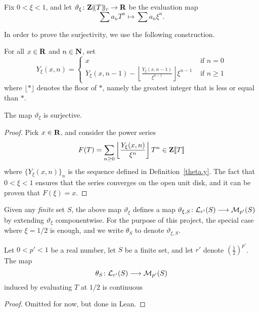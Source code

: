 \begin{definition}
  \label{theta}
  \leanok
  Fix $0<\xi <1$, and let $\vartheta_{\xi}\colon \mathbf{Z}(\!(T)\!)_r\rightarrow \mathbf{R}$ be the evaluation map
  \[
    \sum a_nT^n\longmapsto \sum a_n\xi^n.
  \]
\end{definition}

In order to prove the surjectivity, we use the following construction.
\begin{definition}
  \label{theta.y}
  \leanok
  For all $x \in \mathbf{R}$ and $n\in\mathbf{N}$, set
  \[
    Y_\xi(x, n)=
    \begin{cases}
      x&\text{ if } n = 0 \\
      Y_\xi(x,n-1) - \left\lfloor \frac{Y_\xi(x,n-1)}{\xi^{n-1}} \right\rfloor \xi^{n-1} & \text{ if } n \ge 1
    \end{cases}
  \]
where $\lfloor \ast \rfloor$ denotes the floor of $\ast$, namely the greatest integer that is less or equal than $\ast$.
\end{definition}

\begin{lemma}
  \label{theta.surjective}
  \leanok
  The map $\vartheta_{\xi}$ is surjective.
\end{lemma}

\begin{proof}
  \leanok
  Pick $x\in \mathbf{R}$, and consider the power series
  \[
    F(T)=\sum_{n\geq 0}\left\lfloor \frac{Y_\xi(x,n)}{\xi^n}\right\rfloor T^n\in\mathbf{Z}[\![T]\!]
  \]
  where $\{Y_\xi(x,n)\}_{n}$ is the sequence defined in Definition~\ref{theta.y}. The fact that $0<\xi<1$ ensures that the series converges on the open unit disk, and it can be proven that $F(\xi)=x$.
\end{proof}

Given any \emph{finite} set $S$, the above map $\vartheta_{\xi}$ defines a map $\vartheta_{\xi,S}\colon \mathcal L_{r'}(S)\longrightarrow \mathcal M_{p'}(S)$ by extending $\vartheta_{\xi}$ componentwise.
For the purpose of this project, the special case where $\xi=1/2$ is enough, and we write $\theta_S$ to denote $\vartheta_{\xi,S}$. 

\begin{lemma}
  \label{theta.continuous}
  \leanok
Let $0<p'<1$ be a real number, let $S$ be a finite set, and let $r'$ denote $\left(\frac{1}{2}\right)^{p'}$. The map
\[
\theta_{S}\colon \mathcal L_{r'}(S)\longrightarrow \mathcal M_{p'}(S)
\]
induced by evaluating $T$ at $1/2$ is continuous
\end{lemma}

\begin{proof}
  \leanok
  Omitted for now, but done in Lean.
\end{proof}


